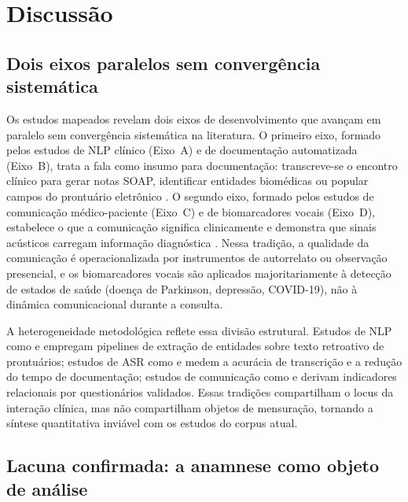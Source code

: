 \documentclass[a4paper,fleqn]{cas-sc}
\begin{document}
\section{Discussão}
\label{sec:discussao}


\subsection*{Dois eixos paralelos sem convergência sistemática}

Os estudos mapeados revelam dois eixos de desenvolvimento que avançam em
paralelo sem convergência sistemática na literatura.
O primeiro eixo, formado pelos estudos de NLP clínico (Eixo~A) e de
documentação automatizada (Eixo~B), trata a fala como insumo para
documentação: transcreve-se o encontro clínico para gerar notas SOAP,
identificar entidades biomédicas ou popular campos do prontuário eletrônico
\citep{Bazoge2023,vanBuchem2021,Falcetta2023,Ng2025}.
O segundo eixo, formado pelos estudos de comunicação médico-paciente
(Eixo~C) e de biomarcadores vocais (Eixo~D), estabelece o que a comunicação
significa clinicamente e demonstra que sinais acústicos carregam informação
diagnóstica \citep{Kelley2014,Fagherazzi2021,Albert2024}.
Nessa tradição, a qualidade da comunicação é operacionalizada por
instrumentos de autorrelato ou observação presencial, e os biomarcadores
vocais são aplicados majoritariamente à detecção de estados de saúde
(doença de Parkinson, depressão, COVID-19), não à dinâmica comunicacional
durante a consulta.

A heterogeneidade metodológica reflete essa divisão estrutural.
Estudos de NLP como \citet{Bazoge2023} e
\citet{Wang2018} empregam pipelines de extração de
entidades sobre texto retroativo de prontuários; estudos de ASR como
\citet{vanBuchem2021} e
\citet{Klusty2025} medem a acurácia de transcrição
e a redução do tempo de documentação; estudos de comunicação como
\citet{Shao2025} e \citet{Kelley2014}
derivam indicadores relacionais por questionários validados.
Essas tradições compartilham o locus da interação clínica, mas não
compartilham objetos de mensuração, tornando a síntese quantitativa
inviável com os estudos do corpus atual.

\subsection*{Lacuna confirmada: a anamnese como objeto de análise}
\end{document}
